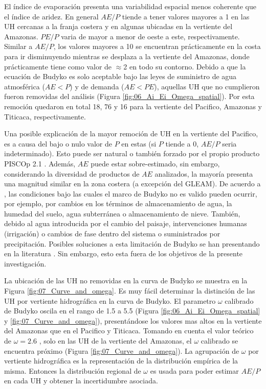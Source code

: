 \documentclass[12pt]{article}
\begin{document}
El índice de evaporación presenta una variabilidad espacial menos coherente que el índice de aridez. En general $AE/P$ tiende a tener valores mayores a 1 en las UH cercanas a la franja costera y en algunas ubicadas en la vertiente del Amazonas. $PE/P$ varia de mayor a menor de oeste a este, respectivamente. Similar a $AE/P$, los valores mayores a 10 se encuentran prácticamente en la costa para ir disminuyendo mientras se desplaza a la vertiente del Amazonas, donde prácticamente tiene como valor de $\approx$2 en todo su contorno. Debido a que la ecuación de Budyko es solo aceptable bajo las leyes de suministro de agua atmosférica ($AE < P$) y de demanda ($AE < PE$), aquellas UH que no cumplieron fueron removidas del análisis (Figura \ref{fig:06_Ai_Ei_Omega_spatial}). Por esta remoción quedaron en total 18, 76 y 16 para la vertiente del Pacifico, Amazonas y Titicaca, respectivamente.

\clearpage %

\clearpage %

Una posible explicación de la mayor remoción de UH en la vertiente del Pacifico, es a causa del bajo o nulo valor de $P$ en estas (si $P$ tiende a 0, $AE/P$ seria indeterminado). Esto puede ser natural o también forzado por el propio producto PISCOp 2.1 \citep{Aybar2019}. Además, $AE$ puede estar sobre-estimado, sin embargo, considerando la diversidad de productos de $AE$ analizados, la mayoría presenta una magnitud similar en la zona costera (a excepción del GLEAM). De acuerdo a \citet{greve2016two}, las condiciones bajo las cuales el marco de Budyko no es valido pueden ocurrir, por ejemplo, por cambios en los términos de almacenamiento de agua, la humedad del suelo, agua subterránea o almacenamiento de nieve. También, debido al agua introducida por el cambio del paisaje, intervenciones humanas (irrigación) o cambios de fase dentro del sistema o suministrados por precipitación. Posibles soluciones a esta limitación de Budyko se han presentando en la literatura \citep{greve2016two,moussa2016budyko,fathi2019new}. Sin embargo, esto esta fuera de los objetivos de la presente investigación. 



La ubicación de las UH no removidas en la curva de Budyko se muestra en la Figura \ref{fig:07_Curve_and_omega}. Es muy fácil determinar la distinción de las UH por vertiente hidrográfica en la curva de Budyko. El parametro $\omega$ calibrado de Budyko oscila en el rango de 1.5 a 5.5 (Figura \ref{fig:06_Ai_Ei_Omega_spatial} y \ref{fig:07_Curve_and_omega}), presentándose los valores mas altos en la vertiente del Amazonas que en el Pacifico y Titicaca. Tomando en cuenta el valor teórico de $\omega = 2.6$ \citep{Fu1981}, solo en las UH de la vertiente del Amazonas, el $\omega$ calibrado se encuentra próximo (Figura \ref{fig:07_Curve_and_omega}). La agrupación de $\omega$ por vertiente hidrográfica es la representación de la distribución empírica de la misma. Entonces la distribución regional de $\omega$ es usada para poder estimar $AE/P$ en cada UH y obtener la incertidumbre asociada.
\end{document}
